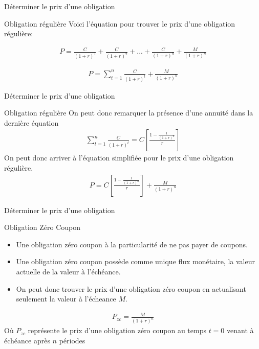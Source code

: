 \documentclass[11pt]{beamer}
\begin{document}
\begin{frame}{Déterminer le prix d'une obligation}
\begin{block}{Obligation régulière}
Voici l'équation pour trouver le prix d'une obligation régulière:

\begin{align*}
P=\frac{C}{(1+r)^1}+\frac{C}{(1+r)^2}+...+\frac{C}{(1+r)^n}+\frac{M}{(1+r)^n}
\end{align*}

\begin{align*}
P=\sum_{t=1}^{n} \frac{C}{(1+r)^t}+\frac{M}{(1+r)^n}
\end{align*}

\end{block}
\end{frame}



\begin{frame}{Déterminer le prix d'une obligation}
\begin{block}{Obligation régulière}
On peut donc remarquer la présence d'une annuité dans la dernière équation 
\begin{align*}
\sum_{t=1}^{n} \frac{C}{(1+r)^t}=C \left[ \frac{1-\frac{1}{(1+r)^n}}{r} \right]
\end{align*}
On peut donc arriver à l'équation simplifiée pour le prix d'une obligation régulière.
\begin{align*}
P=C \left[ \frac{1-\frac{1}{(1+r)^n}}{r} \right]+\frac{M}{(1+r)^n}
\end{align*}

\end{block}
\end{frame}


\begin{frame}{Déterminer le prix d'une obligation}
\begin{block}{Obligation Zéro Coupon}
\begin{itemize}
\item Une obligation zéro coupon à la particularité de ne pas payer de coupons. 
\item Une obligation zéro coupon possède comme unique flux monétaire, la valeur actuelle de la valeur à l'échéance. 
\item On peut donc trouver le prix d'une obligation zéro coupon en actualisant seulement la valeur à l'écheance $M$. 
\end{itemize}
\begin{align*}
P_{zc}=\frac{M}{(1+r)^n}
\end{align*}
Où $P_{zc}$ représente le prix d'une obligation zéro coupon au temps $t=0$ venant à échéance après $n$ périodes 
\end{block}
\end{frame}
\end{document}
